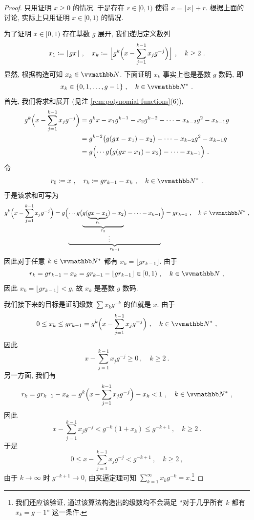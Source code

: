 \begin{proof}
    只用证明 \(x \geq 0\) 的情况. 于是存在 \(r \in [0, 1)\) 使得 \(x = \lfloor x \rfloor + r\). 根据上面的讨论, 实际上只用证明 \(x \in [0, 1)\) 的情况.

    为了证明 \(x \in [0, 1)\) 存在基数 \(g\) 展开, 我们递归定义数列
    \[
        x_1 \coloneqq \lfloor g x \rfloor\ ,\quad x_k \coloneqq \Bigl\lfloor g^k \Bigl(x - \sum_{j = 1}^{k - 1} x_j g^{- j}\Bigr)\Bigr\rfloor\ ,\quad k \geq 2\ .
    \]
    显然, 根据构造可知 \(x_k \in \N\). 下面证明 \(x_k\) 事实上也是基数 \(g\) 数码, 即
    \[
        x_k \in \{0, 1, \ldots, g - 1\}\ ,\quad k \in \N^\ast\ .
    \]
    首先, 我们将求和展开 (见注 \ref{rem:polynomial-functions}(6)),
    \begin{align*}
        g^k \Bigl(x - \sum_{j = 1}^{k - 1} x_j g^{- j}\Bigr) &= g^k x - x_1 g^{k - 1} - x_2 g^{k - 2} - \cdots - x_{k - 2} g^2 - x_{k - 1} g\\
        &= g^{k - 2} \bigl(g (g x - x_1) - x_2\bigr) - \cdots - x_{k - 2} g^2 - x_{k - 1} g\\
        &= g \Bigl(\cdots g \bigl(g (g x - x_1) - x_2\bigr) - \cdots - x_{k - 1}\Bigr)\ .
    \end{align*}
    令
    \[
        r_0 \coloneqq x\ ,\quad r_k \coloneqq g r_{k - 1} - x_k\ ,\quad k \in \N^\ast\ .
    \]
    于是该求和可写为
    \[
        g^k \Bigl(x - \sum_{j = 1}^{k - 1} x_j g^{- j}\Bigr) = g \Bigl(\underbrace{\cdots g \bigl(\underbrace{g (\underbrace{g x - x_1}_{r_1}) - x_2}_{\substack{r_2 \\ \qquad \vdots}}\bigr) - \cdots - x_{k - 1}}_{r_{k - 1}}\Bigr) = g r_{k - 1}\ ,\quad k \in \N^\ast\ ,
    \]
    因此对于任意 \(k \in \N^\ast\) 都有 \(x_k = \lfloor g r_{k - 1} \rfloor\). 由于
    \[
        r_k = g r_{k - 1} - x_k = g r_{k - 1} - \lfloor g r_{k - 1} \rfloor \in [0, 1)\ ,\quad k \in \N\ ,
    \]
    因此 \(x_k = \lfloor g r_{k - 1} \rfloor < g\), 故 \(x_k\) 是基数 \(g\) 数码.

    我们接下来的目标是证明级数 \(\sum x_k g^{- k}\) 的值就是 \(x\). 由于
    \[
        0 \leq x_k \leq g r_{k - 1} = g^k \Bigl(x - \sum_{j = 1}^{k - 1} x_j g^{- j}\Bigr)\ ,\quad k \in \N^\ast\ ,
    \]
    因此
    \[
        x - \sum_{j = 1}^{k - 1} x_j g^{- j} \geq 0\ ,\quad k \geq 2\ .
    \]
    另一方面, 我们有
    \[
        r_k = g r_{k - 1} - x_k = g^k \Bigl(x - \sum_{j = 1}^{k - 1} x_j g^{- j}\Bigr) - x_k < 1\ ,\quad k \in \N^\ast\ ,
    \]
    因此
    \[
        x - \sum_{j = 1}^{k - 1} x_j g^{- j} < g^{- k} (1 + x_k) \leq g^{- k + 1}\ ,\quad k \geq 2\ .
    \]
    于是
    \[
        0 \leq x - \sum_{j = 1}^{k - 1} x_j g^{- j} < g^{- k + 1}\ ,\quad k \geq 2\ ,
    \]
    由于 \(k \to \infty\) 时 \(g^{- k + 1} \to 0\), 由夹逼定理可知 \(\sum_{k = 1}^\infty x_k g^{- k} = x\).\footnote{我们还应该验证, 通过该算法构造出的级数均不会满足 ``对于几乎所有 \(k\) 都有 \(x_k = g - 1\)'' 这一条件.}


\end{proof}
